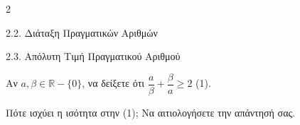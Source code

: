 \begin{ylh}{2}
    \item 2.2. Διάταξη Πραγματικών Αριθμών
    \item 2.3. Απόλυτη Τιμή Πραγματικού Αριθμού
\end{ylh}

\begin{alist}
\item Αν $a, \beta \in \mathbb{R} - \{0\}$, να δείξετε ότι $\dfrac{a}{\beta} + \dfrac{\beta}{a} \ge 2$ (1).
\item Πότε ισχύει η ισότητα στην (1); Να αιτιολογήσετε την απάντησή σας.
\end{alist}

